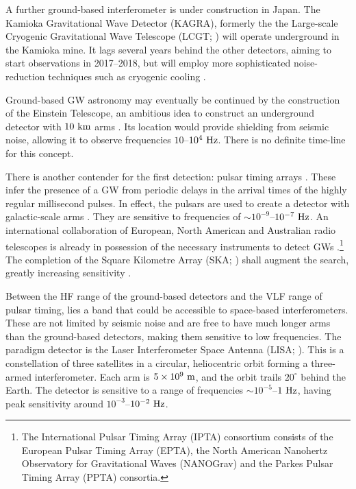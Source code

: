 A further ground-based interferometer is under construction in Japan. The Kamioka Gravitational Wave Detector (KAGRA), formerly the the Large-scale Cryogenic Gravitational Wave Telescope (LCGT; \citealt{Kuroda1999,Kuroda2010}) will operate underground in the Kamioka mine. It lags several years behind the other detectors, aiming to start observations in 2017--2018, but will employ more sophisticated noise-reduction techniques such as cryogenic cooling \citep{Somiya2012}.

Ground-based GW astronomy may eventually be continued by the construction of the Einstein Telescope, an ambitious idea to construct an underground detector with $10~\mathrm{km}$ arms \citep{Punturo2010,Hild2011,Sathyaprakash2012}. Its location would provide shielding from seismic noise, allowing it to observe frequencies $10$--$10^4~\mathrm{Hz}$. There is no definite time-line for this concept.

There is another contender for the first detection: pulsar timing arrays \citep{McWilliams2012,Sesana2012a}. These infer the presence of a GW from periodic delays in the arrival times of the highly regular millisecond pulses. In effect, the pulsars are used to create a detector with galactic-scale arms \citep{Hellings1983}. They are sensitive to frequencies of $\sim10^{-9}$--$10^{-7}~\mathrm{Hz}$. An international collaboration of European, North American and Australian radio telescopes is already in possession of the necessary instruments to detect GWs \citep{Hobbs2010}.\footnote{The International Pulsar Timing Array (IPTA) consortium consists of the European Pulsar Timing Array (EPTA), the North American Nanohertz Observatory for Gravitational Waves (NANOGrav) and the Parkes Pulsar Timing Array (PPTA) consortia.} The completion of the Square Kilometre Array (SKA; \citealt{Dewdney2009}) shall augment the search, greatly increasing sensitivity \citep{Kramer2004}.

Between the HF range of the ground-based detectors and the VLF range of pulsar timing, lies a band that could be accessible to space-based interferometers. These are not limited by seismic noise and are free to have much longer arms than the ground-based detectors, making them sensitive to low frequencies. The paradigm detector is the Laser Interferometer Space Antenna (LISA; \citealt{Bender1998, Danzmann2003}). This is a constellation of three satellites in a circular, heliocentric orbit forming a three-armed interferometer. Each arm is $5 \times 10^9~\mathrm{m}$, and the orbit trails $20^{\circ}$ behind the Earth. The detector is sensitive to a range of frequencies $\sim10^{-5}$--$1~\mathrm{Hz}$, having peak sensitivity around $10^{-3}$--$10^{-2}~\mathrm{Hz}$.

